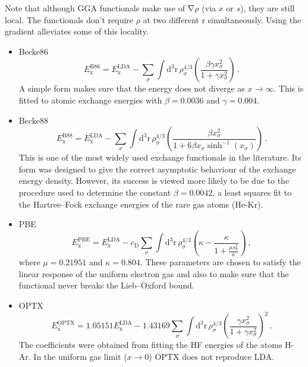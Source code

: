 \documentclass{article}
\theoremstyle{plain}\theoremheaderfont{\normalfont\itshape}\theorembodyfont{\rmfamily}\theoremseparator{.}\newtheorem*{rem}{Remark}\newtheorem*{ex}{Example}\newtheorem*{proof}{Proof}\newtheorem*{altp}{Alternative proof}
\theoremstyle{plain}\theoremheaderfont{\normalfont\bfseries}\theorembodyfont{\rmfamily}\theoremseparator{.}\newtheorem{thm}{Theorem}[section]\newtheorem{lem}[thm]{Lemma}\newtheorem{prop}[thm]{Proposition}\newtheorem*{cor}{Corollary}\newtheorem{defn}[thm]{Definition}\newtheorem{clm}[thm]{Claim}\newtheorem{clminproof}{Claim}
\theoremstyle{break}\theoremheaderfont{\normalfont\itshape}\theorembodyfont{\rmfamily}\theoremseparator{.\medskip}\newtheorem*{proofskip}{Proof}\newtheorem*{exs}{Examples}\newtheorem*{rems}{Remarks}
\theoremstyle{break}\theoremheaderfont{\normalfont\bfseries}\theorembodyfont{\rmfamily}\theoremseparator{.\medskip}\newtheorem{lemskip}[thm]{Lemma}\newtheorem{defnskip}[thm]{Definition}\newtheorem{propskip}[thm]{Proposition}\newtheorem{thmskip}[thm]{Theorem}
\numberwithin{equation}{section}
\newcommand{\dd}[2][]{\mathrm{d}^{#1} #2\,}
\newcommand{\vb}[1]{\bm{\mathrm{#1}}}
\newcommand{\grad}{\vb{\nabla}}
\newcommand{\x}{_{\text{x}}}
\begin{document}
    Note that although GGA functionals make use of \(\grad\rho\) (via \(x\) or \(s\)), they are still local. The functionals don't require \(\rho\) at two different \(\vb{r}\) simultaneously. Using the gradient alleviates some of this locality.

    \begin{itemize}[topsep=0pt]
        \item Becke86
        \begin{equation}
            E\x^{\text{B86}}=E\x^{\text{LDA}}-\sum_{\sigma}\int\dd[3]{\vb{r}}\rho_\sigma^{4/3}\left(\frac{\beta\gamma x_\sigma^2}{1+\gamma x_\sigma^2}\right)\,.
        \end{equation}
        A simple form makes sure that the energy does not diverge as \(x\to\infty\). This is fitted to atomic exchange energies with \(\beta=0.0036\) and \(\gamma=0.004\).
        \item Becke88
        \begin{equation}
            E\x^{\text{B88}}=E\x^{\text{LDA}}-\sum_{\sigma}\int\dd[3]{\vb{r}}\rho_\sigma^{4/3}\left(\frac{\beta x_\sigma^2}{1+6\beta x_\sigma\sinh^{-1}(x_\sigma)}\right)\,.
        \end{equation}
        This is one of the most widely used exchange functionals in the literature. Its form was designed to give the correct asymptotic behaviour of the exchange energy density. However, its success is viewed more likely to be due to the procedure used to determine the constant \(\beta=0.0042\), a least squares fit to the Hartree--Fock exchange energies of the rare gas atoms (He-Kr).
        \item PBE
        \begin{equation}
            E\x^{\text{PBE}}=E\x^{\text{LDA}}-c_{\text{D}}\sum_\sigma \int\dd[3]{\vb{r}}\rho_\sigma^{4/3}\left(\kappa-\frac{\kappa}{1+\frac{\mu s_\sigma^2}{\kappa}}\right)\,,
        \end{equation}
        where \(\mu=0.21951\) and \(\kappa=0.804\). These parameters are chosen to satisfy the linear response of the uniform electron gas and also to make sure that the functional never breaks the Lieb--Oxford bound.
        \item OPTX
        \begin{equation}
            E\x^{\text{OPTX}}=1.05151E\x^{\text{LDA}}-1.43169\sum_\sigma\int\dd[3]{\vb{r}}\rho_\sigma^{4/3}\left(\frac{\gamma x_\sigma^2}{1+\gamma x_\sigma^2}\right)^2\,.
        \end{equation}
        The coefficients were obtained from fitting the HF energies of the atoms H-Ar. In the uniform gas limit (\(x\to 0\)) OPTX does not reproduce LDA.
    \end{itemize}
\end{document}
